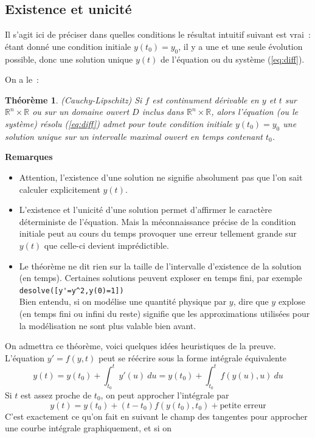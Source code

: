 \documentclass[a4paper,11pt]{article}
\newtheorem{thm}{Théorème}
\newcommand{\R}{{\mathbb{R}}}
\begin{document}
\subsection{Existence et unicit\'e} \label{sec:existence}
Il s'agit ici de pr\'eciser dans quelles conditions le r\'esultat
intuitif suivant est vrai~: \'etant donn\'e une condition initiale
$y(t_0)=y_0$, il y a une et une seule \'evolution possible, donc
une solution unique $y(t)$ de l'\'equation ou du syst\`eme
(\ref{eq:diff}).

On a le~:
\begin{thm} \label{thm:eqdiff} (Cauchy-Lipschitz)
Si $f$ est continument d\'erivable en $y$ et $t$ sur $\R^n \times \R$
ou sur un domaine ouvert $D$ inclus dans $\R^n \times \R$, alors l'\'equation
(ou le syst\`eme) r\'esolu (\ref{eq:diff}) admet pour toute condition
initiale $y(t_0)=y_0$ une solution unique
sur un intervalle maximal ouvert en temps contenant $t_0$.
\end{thm}
{\bf Remarques}
\begin{itemize}
\item
Attention, l'existence d'une solution ne signifie absolument pas que
l'on sait calculer explicitement $y(t)$.
\item
L'existence et l'unicit\'e d'une solution permet d'affirmer le
caract\`ere d\'eterministe de l'\'equation. Mais la m\'econnaissance
pr\'ecise de la condition initiale peut au cours du temps
provoquer une erreur tellement grande sur $y(t)$
que celle-ci devient impr\'edictible.
\item Le th\'eor\`eme ne dit rien sur la taille de l'intervalle
d'existence de la solution (en temps). Certaines solutions
peuvent exploser en temps fini, par exemple\\
\verb|desolve([y'=y^2,y(0)=1])|\\
Bien entendu, si on mod\'elise une quantit\'e physique par $y$, dire
que $y$ explose (en temps fini ou infini du reste)
signifie que les approximations utilis\'ees pour la mod\'elisation
ne sont plus valable bien avant.
\end{itemize}
On admettra ce th\'eor\`eme, voici quelques id\'ees heuristiques
de la preuve. L'\'equation $y'=f(y,t)$ peut se r\'e\'ecrire sous la forme
int\'egrale \'equivalente 
$$y(t)=y(t_0)+\int_{t_0}^t y'(u) \ du =
 y(t_0)+\int_{t_0}^t f(y(u),u)\ du $$ 
Si $t$ est assez proche de $t_0$, on peut approcher l'int\'egrale par 
$$ y(t) = y(t_0) + (t-t_0) f(y(t_0),t_0) + \mbox{petite erreur}$$
C'est exactement ce qu'on fait en suivant le champ des tangentes
pour approcher une courbe int\'egrale graphiquement, et si on
\end{document}
